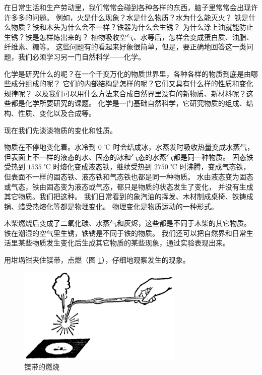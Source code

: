 
在日常生活和生产劳动里，我们常常会碰到各种各样的东西，脑子里常常会出现许许多多的问题。
例如，火是什么现象？水是什么物质？水为什么能灭火？
铁是什么物质？铁和木头为什么会不一样？铁器为什么会生锈？
为什么涂上油就能防止生锈？铁是怎样炼出来的？
植物吸收空气、水等后，怎样会变成蛋白质、油脂、纤维素、糖等。
这些问题有的看起来好象很简单，但是，要正确地回答这一类问题，我们必须学习另一门自然科学——化学。

化学是研究什么的呢？在一个千变万化的物质世界里，各种各样的物质到底是由哪些成分组成的呢？
它们的内部结构是怎样的呢？它们又具有什么样的性质和变化规律呢？
以及我们可以用什么方法来合成自然界里没有的新物质、新材料呢？这些都是化学所要研究的课题。
化学是一门基础自然科学，它研究物质的组成、结构、性质、变化以及合成等。

现在我们先谈谈物质的变化和性质。

物质在不停地变化着。水冷到 $0$ ℃ 时会结成冰，水蒸发时吸收热量变成水蒸气，
但表面上不一样的液态的水、固态的冰和气态的水蒸气都是同一种物质。
固态铁受热到 $1535$ ℃ 时熔化变成液态铁，继续受热到 $2750$ ℃ 时沸腾，变成气态铁，
但表面不一样的固态铁、液态铁和气态铁也都是同一种物质。
水由液态变为固态或气态，铁由固态变为液态或气态，都只是物质的状态发生了变化，
并没有生成其它物质。我们把这种。
我们日常看到的象汽油的挥发、木材制成桌椅、铁铸成锅、蜡受热熔化等都是物理变化。
物理变化是物质运动的一种形式。

木柴燃烧后变成了二氧化碳、水蒸气和灰烬，这些都是不同于木柴的其它物质。
铁在潮湿的空气里生锈，铁锈是不同于铁的物质。
我们还可以把自然界和日常生活里某些物质发生变化后生成其它物质的某些现象，通过实验表现出来。

\begingroup
\renewcommand{\theshiyan}{\arabic{shiyan}}
\renewcommand{\thefigure}{\arabic{figure}\;}

\begin{shiyan}
用坩埚钳夹住镁带，点燃（图 \ref{fig:xy-1}），仔细地观察发生的现象。
\end{shiyan}

\begin{figure}[htbp]
    \centering
    \includegraphics[width=0.7\textwidth]{../pic/czhx1-xy-1}
    \caption{镁带的燃烧}\label{fig:xy-1}
\end{figure}

